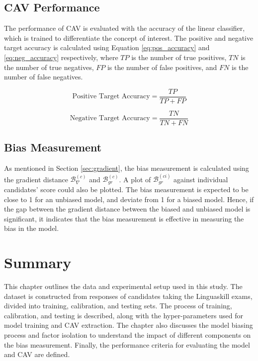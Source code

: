 \subsection{CAV Performance}
The performance of CAV is evaluated with the accuracy of the linear classifier, which is trained to differentiate the concept of interest. The positive and negative target accuracy is calculated using Equation \ref{eq:pos_accuracy} and \ref{eq:neg_accuracy} respectively, where $TP$ is the number of true positives, $TN$ is the number of true negatives, $FP$ is the number of false positives, and $FN$ is the number of false negatives.

\begin{equation} \label{eq:pos_accuracy}
    \text{Positive Target Accuracy} = \frac{TP}{TP + FP}
\end{equation}

\begin{equation} \label{eq:neg_accuracy}
    \text{Negative Target Accuracy} = \frac{TN}{TN + FN}
\end{equation}

\subsection{Bias Measurement}
As mentioned in Section \ref{sec:gradient}, the bias measurement is calculated using the gradient distance $\mathcal{B}^{(c)}_{\nabla}$ and $\mathcal{B}^{(c)}_{gr}$. A plot of $\mathcal{B}^{(ci)}_{gr}$ against individual candidates' score could also be plotted. The bias measurement is expected to be close to 1 for an unbiased model, and deviate from 1 for a biased model. Hence, if the gap between the gradient distance between the biased and unbiased model is significant, it indicates that the bias measurement is effective in measuring the bias in the model.

\section{Summary}
This chapter outlines the data and experimental setup used in this study. The dataset is constructed from responses of candidates taking the Linguaskill exams, divided into training, calibration, and testing sets. The process of training, calibration, and testing is described, along with the hyper-parameters used for model training and CAV extraction. The chapter also discusses the model biasing process and factor isolation to understand the impact of different components on the bias measurement. Finally, the performance criteria for evaluating the model and CAV are defined.